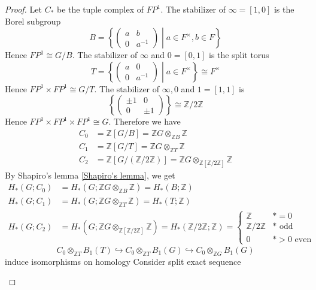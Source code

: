 \documentclass[../main.tex]{subfiles}
\begin{document}
\begin{proof}
Let $C_*$ be the tuple complex of $FP^1$. The stabilizer of $\infty=[1,0]$ is the Borel subgroup
\[B=\left\{\begin{pmatrix}
a&b \\
0&a^{-1}
\end{pmatrix}\middle| a\in F^\times,b\in F\right\}\]
Hence $FP^1\cong G/B$. The stabilizer of $\infty$ and $0=[0,1]$ is the split torus
\[T=\left\{\begin{pmatrix}
a&0 \\
0&a^{-1}
\end{pmatrix}\middle|a\in F^\times\right\}\cong F^\times\]
Hence $FP^1\times FP^1\cong G/T$. The stabilizer of $\infty,0$ and $1=[1,1]$ is
\[\left\{\begin{pmatrix}
\pm1 &0 \\
0& \pm1
\end{pmatrix}\right\}\cong\mathbb Z/2\mathbb Z\]
Hence $FP^1\times FP^1\times FP^1\cong G$. Therefore we have
\begin{align*}
C_0&=\mathbb Z[G/B]=\mathbb ZG\otimes_{\mathbb ZB}\mathbb Z \\
C_1&=\mathbb Z[G/T]=\mathbb ZG\otimes_{\mathbb ZT}\mathbb Z \\
C_2&=\mathbb Z[G/(\mathbb Z/2\mathbb Z)]=\mathbb ZG\otimes_{\mathbb Z[\mathbb Z/2\mathbb Z]}\mathbb Z
\end{align*}
By Shapiro's lemma \ref{Shapiro's lemma}, we get
\begin{align*}
H_*(G;C_0)&=H_*(G;\mathbb ZG\otimes_{\mathbb ZB}\mathbb Z)=H_*(B;\mathbb Z) \\
H_*(G;C_1)&=H_*(G;\mathbb ZG\otimes_{\mathbb ZT}\mathbb Z)=H_*(T;\mathbb Z) \\
H_*(G;C_2)&=H_*(G;\mathbb ZG\otimes_{\mathbb Z[\mathbb Z/2\mathbb Z]}\mathbb Z)=H_*(\mathbb Z/2\mathbb Z;\mathbb Z)=\begin{cases}
\mathbb Z &*=0 \\
\mathbb Z/2\mathbb Z &*\text{ odd} \\
0 &*>0\text{ even}
\end{cases}
\end{align*}
\[C_0\otimes_{\mathbb ZT}B_1(T)\hookrightarrow C_0\otimes_{\mathbb ZT}B_1(G)\hookrightarrow C_0\otimes_{\mathbb ZG}B_1(G)\]
induce isomorphisms on homology
Consider split exact sequence
\begin{center}
\end{center}
\end{proof}
\end{document}
